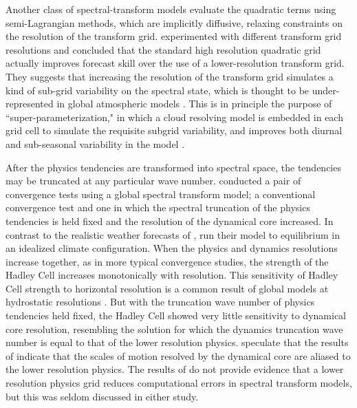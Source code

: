 \documentclass{agujournal}
\begin{document}
Another class of spectral-transform models evaluate the quadratic terms using semi-Lagrangian methods, which are implicitly diffusive, relaxing constraints on the resolution of the transform grid. \cite{W2014PTRSL} experimented with different transform grid resolutions and concluded that the standard high resolution quadratic grid actually improves forecast skill over the use of a lower-resolution transform grid. They suggests that increasing the resolution of the transform grid simulates a kind of sub-grid variability on the spectral state, which is thought to be under-represented in global atmospheric models \citep{S2005QJR}. This is in principle the purpose of ``super-parameterization," in which a cloud resolving model is embedded in each grid cell to simulate the requisite subgrid variability, and improves both diurnal and sub-seasonal variability in the model \citep{RKAG2003BAMS}.

After the physics tendencies are transformed into spectral space, the tendencies may be truncated at any particular wave number. \cite{W1999T} conducted a pair of convergence tests using a global spectral transform model; a conventional convergence test and one in which the spectral truncation of the physics tendencies is held fixed and the resolution of the dynamical core increased. In contrast to the realistic weather forecasts of \cite{W2014PTRSL}, \cite{W1999T} run their model to equilibrium in an idealized climate configuration. When the physics and dynamics resolutions increase together, as in more typical convergence studies, the strength of the Hadley Cell increases monotonically with resolution. This sensitivity of Hadley Cell strength to horizontal resolution is a common result of global models at hydrostatic resolutions \citep[see][and references therein]{HR2017JCLIM}. But with the truncation wave number of physics tendencies held fixed, the Hadley Cell showed very little sensitivity to dynamical core resolution, resembling the solution for which the dynamics truncation wave number is equal to that of the lower resolution physics. \cite{HR2017JCLIM} speculate that the results of \cite{W1999T} indicate that the scales of motion resolved by the dynamical core are aliased to the lower resolution physics. The results of \cite{W1999T,W2014PTRSL} do not provide evidence that a lower resolution physics grid reduces computational errors in spectral transform models, but this was seldom discussed in either study.  
\end{document}
